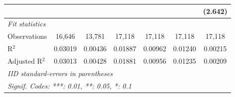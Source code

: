 \begin{tabular}{lcccccc}
                  &                 &                         &                 &                 &                 & (2.642)\\   
   \midrule
   \emph{Fit statistics}\\
   Observations   & 16,646          & 13,781                  & 17,118          & 17,118          & 17,118          & 17,118\\  
   R$^2$          & 0.03019         & 0.00436                 & 0.01887         & 0.00962         & 0.01240         & 0.00215\\  
   Adjusted R$^2$ & 0.03013         & 0.00428                 & 0.01881         & 0.00956         & 0.01235         & 0.00209\\  
   \midrule \midrule
   \multicolumn{7}{l}{\emph{IID standard-errors in parentheses}}\\
   \multicolumn{7}{l}{\emph{Signif. Codes: ***: 0.01, **: 0.05, *: 0.1}}\\
\end{tabular}
\par\endgroup



